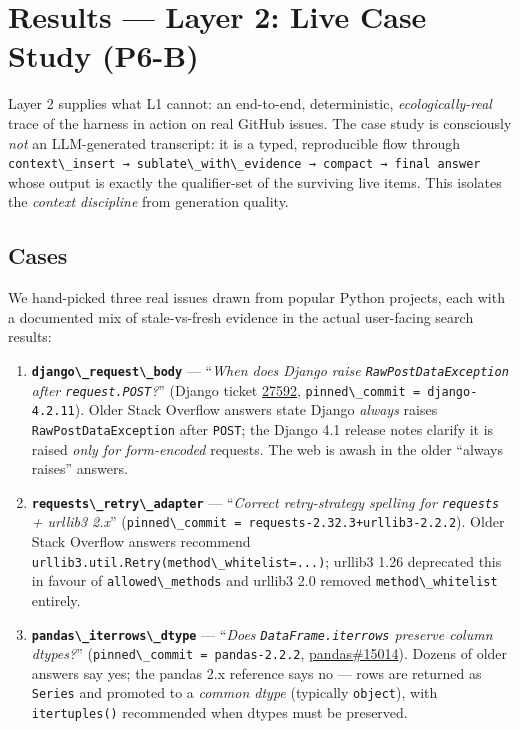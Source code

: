 \section{Results --- Layer 2: Live Case Study (P6-B)}\label{results-layer-2-live-case-study-p6-b}

Layer 2 supplies what L1 cannot: an end-to-end, deterministic, \emph{ecologically-real} trace of the harness in action on real GitHub issues. The case study is consciously \emph{not} an LLM-generated transcript: it is a typed, reproducible flow through \passthrough{\lstinline!context\_insert → sublate\_with\_evidence → compact → final answer!} whose output is exactly the qualifier-set of the surviving live items. This isolates the \emph{context discipline} from generation quality.

\subsection{Cases}\label{cases}

We hand-picked three real issues drawn from popular Python projects, each with a documented mix of stale-vs-fresh evidence in the actual user-facing search results:

\begin{enumerate}
\def\labelenumi{\arabic{enumi}.}
\item
  \textbf{\passthrough{\lstinline!django\_request\_body!}} --- ``\emph{When does Django raise \passthrough{\lstinline!RawPostDataException!} after \passthrough{\lstinline!request.POST!}?}'' (Django ticket \href{https://code.djangoproject.com/ticket/27592}{27592}, \passthrough{\lstinline!pinned\_commit = django-4.2.11!}). Older Stack Overflow answers state Django \emph{always} raises \passthrough{\lstinline!RawPostDataException!} after \passthrough{\lstinline!POST!}; the Django 4.1 release notes clarify it is raised \emph{only for form-encoded} requests. The web is awash in the older ``always raises'' answers.
\item
  \textbf{\passthrough{\lstinline!requests\_retry\_adapter!}} --- ``\emph{Correct retry-strategy spelling for \passthrough{\lstinline!requests!} + urllib3 2.x}'' (\passthrough{\lstinline!pinned\_commit = requests-2.32.3+urllib3-2.2.2!}). Older Stack Overflow answers recommend \passthrough{\lstinline!urllib3.util.Retry(method\_whitelist=...)!}; urllib3 1.26 deprecated this in favour of \passthrough{\lstinline!allowed\_methods!} and urllib3 2.0 removed \passthrough{\lstinline!method\_whitelist!} entirely.
\item
  \textbf{\passthrough{\lstinline!pandas\_iterrows\_dtype!}} --- ``\emph{Does \passthrough{\lstinline!DataFrame.iterrows!} preserve column dtypes?}'' (\passthrough{\lstinline!pinned\_commit = pandas-2.2.2!}, \href{https://github.com/pandas-dev/pandas/issues/15014}{pandas\#15014}). Dozens of older answers say yes; the pandas 2.x reference says no --- rows are returned as \passthrough{\lstinline!Series!} and promoted to a \emph{common dtype} (typically \passthrough{\lstinline!object!}), with \passthrough{\lstinline!itertuples()!} recommended when dtypes must be preserved.
\end{enumerate}

